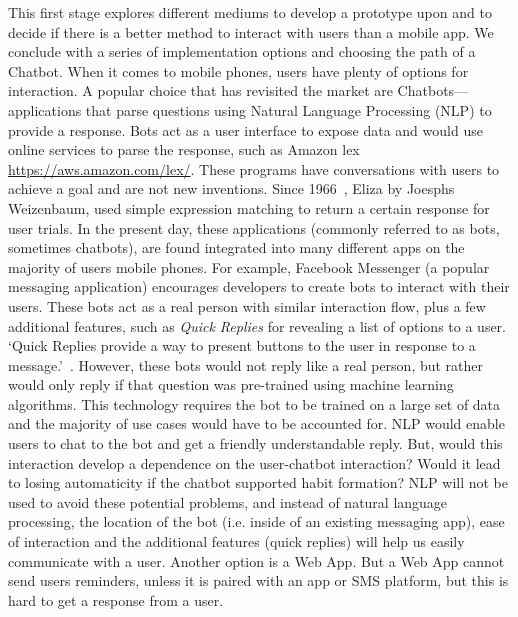 This first stage explores different mediums to develop a prototype upon and to decide if there is a better method to interact with users than a mobile app. We conclude with a series of implementation options and choosing the path of a Chatbot.\newline
\newline
When it comes to mobile phones, users have plenty of options for interaction. A popular choice that has revisited the market are Chatbots---applications that parse questions using Natural Language Processing (NLP) to provide a response. Bots act as a user interface to expose data and would use online services to parse the response, such as Amazon lex \url{https://aws.amazon.com/lex/}. These programs have conversations with users to achieve a goal and are not new inventions. Since 1966~\cite{article_eliza}, Eliza by Joesphs Weizenbaum, used simple expression matching to return a certain response for user trials. In the present day, these applications (commonly referred to as bots, sometimes chatbots), are found integrated into many different apps on the majority of users mobile phones. For example, Facebook Messenger (a popular messaging application) encourages developers to create bots to interact with their users. These bots act as a real person with similar interaction flow, plus a few additional features, such as \textit{Quick Replies} for revealing a list of options to a user. `Quick Replies provide a way to present buttons to the user in response to a message.'~\cite{doc_fb_quick_replies}. However, these bots would not reply like a real person, but rather would only reply if that question was pre-trained using machine learning algorithms. This technology requires the bot to be trained on a large set of data and the majority of use cases would have to be accounted for.\newline
\newline
NLP would enable users to chat to the bot and get a friendly understandable reply. But, would this interaction develop a dependence on the user-chatbot interaction? Would it lead to losing automaticity if the chatbot supported habit formation? NLP will not be used to avoid these potential problems, and instead of natural language processing, the location of the bot (i.e. inside of an existing messaging app), ease of interaction and the additional features (quick replies) will help us easily communicate with a user.\newline
\newline
Another option is a Web App. But a Web App cannot send users reminders, unless it is paired with an app or SMS platform, but this is hard to get a response from a user.\newline
